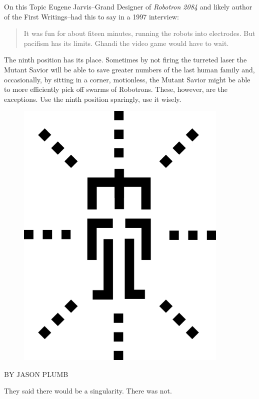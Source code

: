 \documentclass{amsbook}
\begin{document}
On this Topic Eugene Jarvis--Grand Designer of {\em Robotron 2084} and
likely author of the First Writings--had this to say in a 1997
interview:

\begin{quotation}
    It was fun for about fiteen minutes, running the robots into
    electrodes. But pacifism has its limits. Ghandi the video game
    would have to wait.
\end{quotation}

The ninth position has its place. Sometimes by not firing the turreted
laser the Mutant Savior will be able to save greater numbers of the
last human family and, occasionally, by sitting in a corner,
motionless, the Mutant Savior might be able to more efficiently pick
off swarms of Robotrons. These, however, are the exceptions. Use the
ninth position sparingly, use it wisely.

\clearpage

\begin{figure}
  \includegraphics[width=4in]{mcor-logo11.png}
\end{figure}

\vskip 72pt

\clearpage

{\ROBOFONTx BY JASON PLUMB}

They said there would be a singularity.  There was not.
\end{document}
